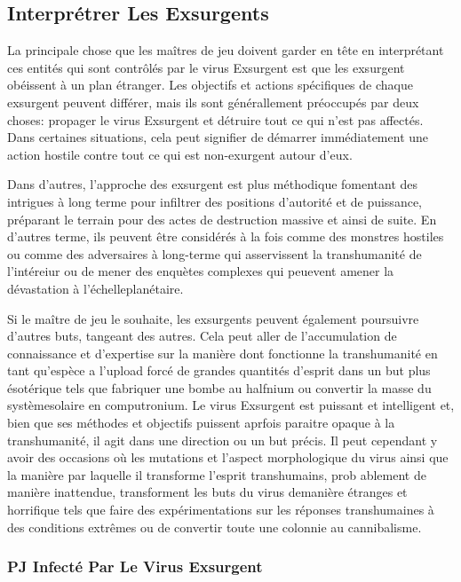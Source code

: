 \subsection{Interprétrer Les Exsurgents} 

La principale chose que les maîtres de jeu doivent garder en tête en interprétant ces entités qui sont contrôlés par le virus Exsurgent est que les exsurgent obéissent à un plan étranger. Les objectifs et actions spécifiques de chaque exsurgent peuvent différer, mais ils sont générallement préoccupés par deux choses: propager le virus Exsurgent et détruire tout ce qui n'est pas affectés. Dans certaines situations, cela peut signifier de démarrer immédiatement une action hostile contre tout ce qui est non-exurgent autour d'eux. 

Dans d'autres, l'approche des exsurgent est plus méthodique fomentant des intrigues à long terme pour infiltrer des positions d'autorité et de puissance, préparant le terrain pour des actes de destruction massive et ainsi de suite. En d'autres terme, ils peuvent être considérés à la fois comme des monstres hostiles ou comme des adversaires à long-terme qui asservissent la transhumanité de l'intéreiur ou de mener des enquètes complexes qui peuevent amener la dévastation à l'échelleplanétaire. 

Si le maître de jeu le souhaite, les exsurgents peuvent également poursuivre d'autres buts, tangeant des autres. Cela peut aller de l'accumulation de connaissance et d'expertise sur la manière dont fonctionne la transhumanité en tant qu'espèce a l'upload forcé de grandes quantités d'esprit dans un but plus ésotérique tels que fabriquer une bombe au halfnium ou convertir la masse du systèmesolaire en computronium. Le virus Exsurgent est puissant et intelligent et, bien que ses méthodes et objectifs puissent aprfois paraitre opaque à la transhumanité, il agit dans une direction ou un but précis. Il peut cependant y avoir des occasions où les mutations et l'aspect morphologique du virus ainsi que la manière par laquelle il transforme l'esprit transhumains, prob ablement de manière inattendue, transforment les buts du virus demanière étranges et horrifique tels que faire des expérimentations sur les réponses transhumaines à des conditions extrêmes ou de convertir toute une colonnie au cannibalisme. 

\subsubsection{PJ Infecté Par Le Virus Exsurgent} 

